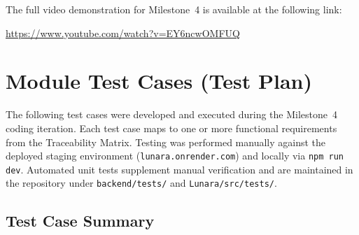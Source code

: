 \documentclass[12pt,letterpaper]{article}
\begin{document}
The full video demonstration for Milestone~4 is available at the following link:

\begin{center}
\url{https://www.youtube.com/watch?v=EY6ncwOMFUQ}
\end{center}

\newpage

\section{Module Test Cases (Test Plan)}

The following test cases were developed and executed during the Milestone~4 coding iteration. Each test case maps to one or more functional requirements from the Traceability Matrix. Testing was performed manually against the deployed staging environment (\texttt{lunara.onrender.com}) and locally via \texttt{npm run dev}. Automated unit tests supplement manual verification and are maintained in the repository under \texttt{backend/tests/} and \texttt{Lunara/src/tests/}.

\subsection{Test Case Summary}
\end{document}
